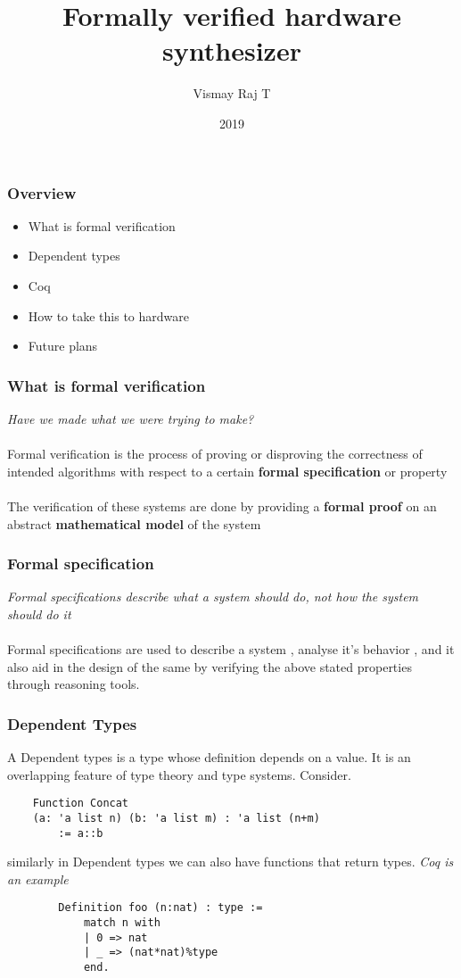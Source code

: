 \documentclass{beamer}
\title{Formally verified hardware synthesizer}
\author{Vismay Raj T}
\institute{IIT Palakkad}
\date{2019}
\begin{document}
 
\frame{\titlepage}
 
\begin{frame}
    \frametitle{Overview}
    \begin{itemize}
        \item What is formal verification
        \item Dependent types
        \item Coq
        \item How to take this to hardware
        \item Future plans
    \end{itemize}
\end{frame}

\begin{frame}
    \frametitle{What is formal verification}
    \textit{Have we made what we were trying to make?} \\~\\ 
    Formal verification is the process of proving or disproving the correctness of intended algorithms
    with respect to a certain \textbf{formal specification} or property \\~\\
    The verification of these systems are done by providing a \textbf{formal proof} on an abstract 
    \textbf{mathematical model} of the system
    \vfill
\end{frame}

\begin{frame}
    \frametitle{Formal specification}

    \textit{Formal specifications describe what a system should do, not how the system should do it}\\~\\

    Formal specifications are used to describe a system , analyse it's behavior , and it also aid in the 
    design of the same by verifying the above stated properties through reasoning tools.

    \vfill

\end{frame}

\begin{frame}[fragile]
    \frametitle{Dependent Types}

    A Dependent types is a type whose definition depends on a value. It is an overlapping feature of type 
    theory and type systems. Consider.
    \begin{verbatim}
    Function Concat 
    (a: 'a list n) (b: 'a list m) : 'a list (n+m) 
        := a::b
    \end{verbatim}
    similarly in Dependent types we can also have functions that return types. \textit{Coq is an example}
    \begin{verbatim}
        Definition foo (n:nat) : type :=
            match n with
            | 0 => nat
            | _ => (nat*nat)%type
            end.
    \end{verbatim}
\end{frame}
\end{document}
